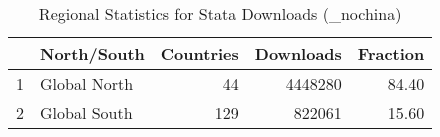 \begin{table}[ht]
\centering
\begin{tabular}{rlrrr}
  \hline
 & North/South & Countries & Downloads & Fraction \\ 
  \hline
1 & Global North &  44 & 4448280 & 84.40 \\ 
  2 & Global South & 129 & 822061 & 15.60 \\ 
   \hline
\end{tabular}
\caption{Regional Statistics for Stata Downloads (_nochina)} 
\label{tab:stata_downloads_global_stats_select_nochina}
\end{table}
